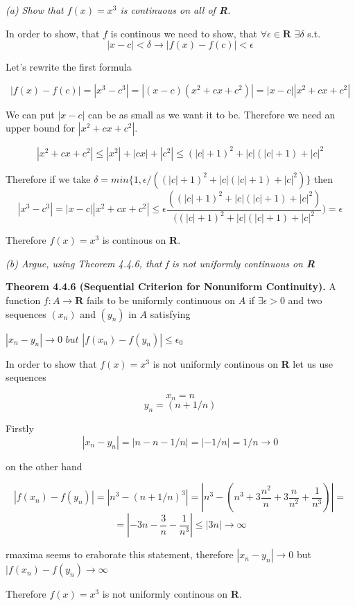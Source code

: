 \documentclass[11pt,oneside,titlepage]{book}
\begin{document}
\textit{(a) Show that $f(x) = x^{3}$ is continuous on all of \textbf{R}.}

In order to show, that $f$ is continous we need to show, that $\forall
\epsilon \in \textbf{R}$ $\exists \delta$ s.t.
$$|x - c| < \delta \to |f(x) - f(c)| < \epsilon$$

Let's rewrite the first formula

$$ |f(x) - f(c)| = |x^{3} - c^{3}| = |(x - c)(x^{2} + cx + c^{2})| =
|x - c||x^{2} + cx + c^{2}|$$

We can put $|x - c|$ can be as small as we want it to be. Therefore we need
an upper bound for $|x^{2} + cx + c^{2}|$.

$$|x^{2} + cx + c^{2}| \leq |x^{2}| + |cx| + |c^{2}| \leq (|c| + 1)^{2} +
|c|(|c| + 1) + |c|^{2}$$



Therefore if we take
$\delta = min\{1, \epsilon/((|c| + 1)^{2} + |c|(|c| + 1) + |c|^{2})\}$
then
$$|x^3 - c^3| = |x-c||x^2 + cx + c^2| \leq \epsilon \frac{((|c| + 1)^{2} +
  |c|(|c| + 1) + |c|^{2}) }{ ((|c| + 1)^{2} + |c|(|c| + 1) + |c|^{2}})
= \epsilon$$

Therefore $f(x) = x ^3$ is continous on \textbf{R}.

\textit{(b) Argue, using Theorem 4.4.6, that f is not uniformly continuous
  on \textbf{R}}


\textbf{Theorem 4.4.6 (Sequential Criterion for Nonuniform Continuity).} A
function $f:A \to \textbf{R}$ fails to be uniformly continuous on $A$ if
$\exists \epsilon > 0 $ and  two sequences $(x_n)$ and $(y_n)$ in $A$
satisfying

$|x_n - y_n| \to 0$ $but$ $|f(x_n) - f(y_n)| \leq \epsilon_0$

In order to show that $f(x) = x^3$ is not uniformly continous on
\textbf{R} let us use sequences

$$x_n = n$$
$$y_n = (n + 1/n)$$

Firstly
$$ |x_n - y_n| = |n - n - 1/n| = |-1/n| = 1/n \to 0$$

on the other hand

$$|f(x_n) - f(y_n)| = |n ^ 3 - (n + 1/n) ^ 3| = |n^3 - (n^3 + 3 \frac{n^2}{n}
+ 3 \frac{n}{n^2} + \frac{1}{n^3})| = $$
$$ = |-3n - \frac{3}{n} - \frac{1}{n^3} | \leq |3n| \to \infty$$

rmaxima seems to eraborate this statement, therefore  $|x_n - y_n| \to 0$
but $|f(x_n) - f(y_n) \to \infty$

Therefore $f(x) = x^3$ is not uniformly continous on \textbf{R}.
\end{document}
